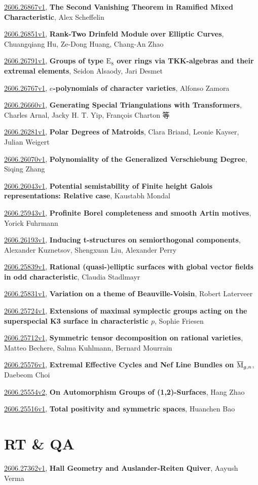 \documentclass[9pt, a4paper]{article}
\theoremstyle{plain}
\theoremstyle{definition}
\theoremstyle{remark}
\newcommand{\arxiv}[3]{\href{https://arxiv.org/abs/#1}{#1}, \textbf{\textcolor{arxivblue}{#2}}, #3}
\begin{document}
\arxiv{2606.26867v1}{The Second Vanishing Theorem in Ramified Mixed Characteristic}{Alex Scheffelin}

\arxiv{2606.26851v1}{Rank-Two Drinfeld Module over Elliptic Curves}{Chuangqiang Hu, Ze-Dong Huang, Chang-An Zhao}

\arxiv{2606.26791v1}{Groups of type $\mathrm{E}_8$ over rings via TKK-algebras and their extremal elements}{Seidon Alsaody, Jari Desmet}

\arxiv{2606.26767v1}{$e$-polynomials of character varieties}{Alfonso Zamora}

\arxiv{2606.26660v1}{Generating Special Triangulations with Transformers}{Charles Arnal, Jacky H. T. Yip, François Charton 等}

\arxiv{2606.26281v1}{Polar Degrees of Matroids}{Clara Briand, Leonie Kayser, Julian Weigert}

\arxiv{2606.26070v1}{Polynomiality of the Generalized Verschiebung Degree}{Siqing Zhang}

\arxiv{2606.26043v1}{Potential semistability of Finite height Galois representations: Relative case}{Kaustabh Mondal}

\arxiv{2606.25943v1}{Profinite Borel completeness and smooth Artin motives}{Yorick Fuhrmann}

\arxiv{2606.26193v1}{Inducing t-structures on semiorthogonal components}{Alexander Kuznetsov, Shengxuan Liu, Alexander Perry}

\arxiv{2606.25839v1}{Rational (quasi-)elliptic surfaces with global vector fields in odd characteristic}{Claudia Stadlmayr}

\arxiv{2606.25831v1}{Variation on a theme of Beauville-Voisin}{Robert Laterveer}

\arxiv{2606.25724v1}{Extensions of maximal symplectic groups acting on the superspecial K3 surface in characteristic $p$}{Sophie Friesen}

\arxiv{2606.25712v1}{Symmetric tensor decomposition on rational varieties}{Matteo Bechere, Salma Kuhlmann, Bernard Mourrain}

\arxiv{2606.25576v1}{Extremal Effective Cycles and Nef Line Bundles on \(\overline{\rm{M}}_{g,n}\)}{Daebeom Choi}

\arxiv{2606.25554v2}{On Automorphism Groups of (1,2)-Surfaces}{Hang Zhao}

\arxiv{2606.25516v1}{Total positivity and symmetric spaces}{Huanchen Bao}


\section{RT \& QA}
\arxiv{2606.27362v1}{Hall Geometry and Auslander-Reiten Quiver}{Aayush Verma}
\end{document}
